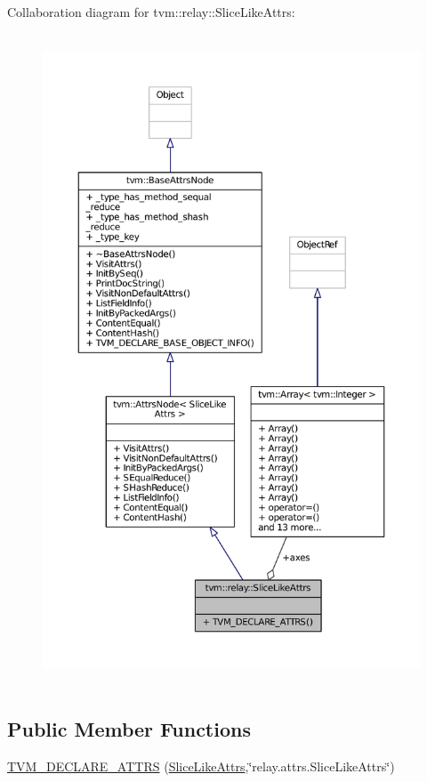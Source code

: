 Collaboration diagram for tvm\+:\+:relay\+:\+:Slice\+Like\+Attrs\+:
\nopagebreak
\begin{figure}[H]
\begin{center}
\leavevmode
\includegraphics[height=550pt]{structtvm_1_1relay_1_1SliceLikeAttrs__coll__graph}
\end{center}
\end{figure}
\subsection*{Public Member Functions}
\begin{DoxyCompactItemize}
\item 
\hyperlink{structtvm_1_1relay_1_1SliceLikeAttrs_a52e285a2e6f505d2b198dfb49c2705cc}{T\+V\+M\+\_\+\+D\+E\+C\+L\+A\+R\+E\+\_\+\+A\+T\+T\+RS} (\hyperlink{structtvm_1_1relay_1_1SliceLikeAttrs}{Slice\+Like\+Attrs},\char`\"{}relay.\+attrs.\+Slice\+Like\+Attrs\char`\"{})
\end{DoxyCompactItemize}
